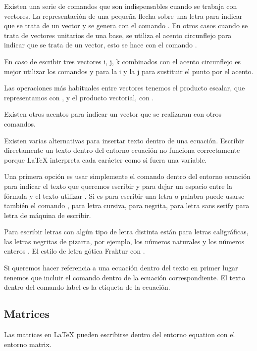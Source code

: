 \documentclass[11pt, a4paper]{article}
\begin{document}
Existen una serie de comandos que son indispensables cuando se trabaja con vectores. La representación de una pequeña flecha sobre una letra para indicar que se trata de un vector y se genera con el comando . En otros casos cuando se trata de vectores unitarios de una base, se utiliza el acento circunflejo para indicar que se trata de un vector, esto se hace con el comando .

En caso de escribir tres vectores i, j, k combinados con el acento circunflejo es mejor utilizar los comandos  y  para la i y la j para sustituir el punto por el acento.

Las operaciones más habituales entre vectores tenemos el producto escalar, que representamos con , y el producto vectorial, con .

Existen otros acentos para indicar un vector que se realizaran con otros comandos.

Existen varias alternativas para insertar texto dentro de una ecuación. Escribir directamente un texto dentro del entorno ecuación no funciona correctamente porque LaTeX interpreta cada carácter como si fuera una variable.

Una primera opción es usar simplemente el comando  dentro del entorno ecuación para indicar el texto que queremos escribir y para dejar un espacio entre la fórmula y el texto utilizar . Si es para escribir una letra o palabra puede usarse también el comando ,  para letra cursiva,  para negrita,  para letra sans serify  para letra de máquina de escribir. 

Para escribir letras con algún tipo de letra distinta están  para letras caligráficas, las letras negritas de pizarra, por ejemplo, los números naturales  y los números enteros . El estilo de letra gótica Fraktur con .

Si queremos hacer referencia a una ecuación dentro del texto en primer lugar tenemos que incluir el comando  dentro de la ecuación correspondiente. El texto dentro del comando label es la etiqueta de la ecuación.

\subsection{Matrices}

Las matrices en LaTeX pueden escribirse dentro del entorno equation con el entorno matrix.
\end{document}
